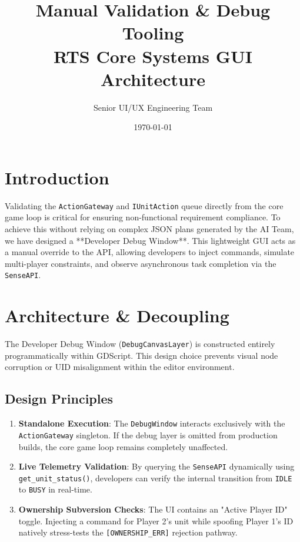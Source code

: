 \documentclass[11pt,a4paper]{article}
\title{Manual Validation \& Debug Tooling\\
\large RTS Core Systems GUI Architecture}
\author{Senior UI/UX Engineering Team}
\date{\today}
\begin{document}
\maketitle
\tableofcontents
\newpage

\section{Introduction}

Validating the \texttt{ActionGateway} and \texttt{IUnitAction} queue directly from the core game loop is critical for ensuring non-functional requirement compliance. To achieve this without relying on complex JSON plans generated by the AI Team, we have designed a **Developer Debug Window**. This lightweight GUI acts as a manual override to the API, allowing developers to inject commands, simulate multi-player constraints, and observe asynchronous task completion via the \texttt{SenseAPI}.

\section{Architecture \& Decoupling}

The Developer Debug Window (\texttt{DebugCanvasLayer}) is constructed entirely programmatically within GDScript. This design choice prevents visual node corruption or UID misalignment within the editor environment.

\subsection{Design Principles}
\begin{enumerate}
    \item \textbf{Standalone Execution}: The \texttt{DebugWindow} interacts exclusively with the \texttt{ActionGateway} singleton. If the debug layer is omitted from production builds, the core game loop remains completely unaffected.
    \item \textbf{Live Telemetry Validation}: By querying the \texttt{SenseAPI} dynamically using \texttt{get\_unit\_status()}, developers can verify the internal transition from \texttt{IDLE} to \texttt{BUSY} in real-time.
    \item \textbf{Ownership Subversion Checks}: The UI contains an "Active Player ID" toggle. Injecting a command for Player 2's unit while spoofing Player 1's ID natively stress-tests the \texttt{[OWNERSHIP\_ERR]} rejection pathway.
\end{enumerate}
\end{document}
